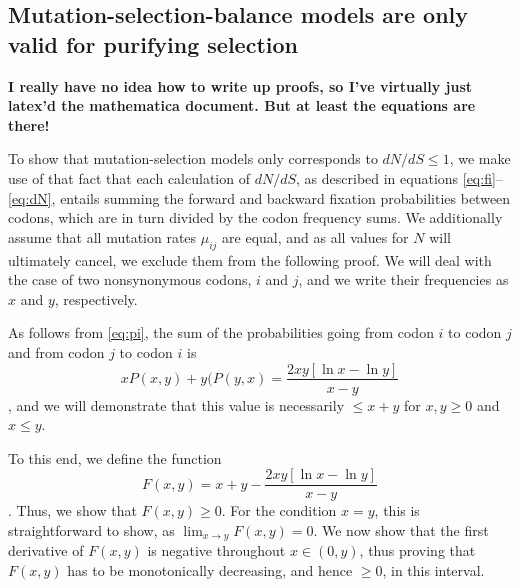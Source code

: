 \documentclass[11pt]{article}
\begin{document}
\subsection*{Mutation-selection-balance models are only valid for purifying selection}

\textbf{I really have no idea how to write up proofs, so I've virtually just latex'd the mathematica document. But at least the equations are there!}

To show that mutation-selection models only corresponds to $dN/dS \leq 1$, we make use of that fact that each calculation of $dN/dS$, as described in equations \eqref{eq:fi}--\eqref{eq:dN}, entails summing the forward and backward fixation probabilities between codons, which are in turn divided by the codon frequency sums. We additionally assume that all mutation rates $\mu_{ij}$ are equal, and as all values for $N$ will ultimately cancel, we exclude them from the following proof. We will deal with the case of two nonsynonymous codons, $i$ and $j$, and we write their frequencies as $x$ and $y$, respectively.

As follows from \eqref{eq:pi}, the sum of the probabilities going from codon $i$ to codon $j$ and from codon $j$ to codon $i$ is \begin{equation} xP(x,y) + y(P(y,x) = \frac{2xy [\ln x - \ln y]}{x - y}\end{equation}, and we will demonstrate that this value is necessarily $\leq x + y$ for $x,y \geq 0$ and $x \leq y$.

To this end, we define the function \begin{equation} F(x,y) = x + y - \frac{2xy [\ln x - \ln y]}{x - y} \end{equation}. Thus, we show that $F(x,y) \geq 0$. For the condition $x=y$, this is straightforward to show, as $\lim_{x \to y}F(x,y) = 0$.
We now show that the first derivative of $F(x, y)$ is negative throughout $x \in (0,y)$, thus proving that $F(x, y)$ has to be monotonically decreasing, and hence $\geq0$, in this interval.
	
\newpage
	
\end{document}
